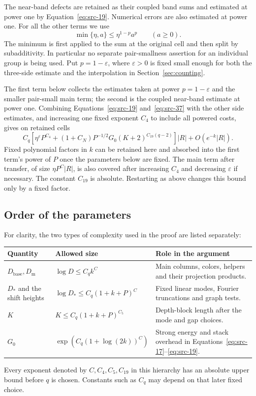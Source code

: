 The near-band defects are retained as their coupled band sums and
estimated at power one by Equation~\eqref{eq:src-19}.  Numerical errors
are also estimated at power one.  For all the other terms we use
\[
 \min\{\eta,a\}\le\eta^{1-p}a^p\qquad(a\ge0).
\]
The minimum is first applied to the sum at the original cell and then
split by subadditivity.  In particular no separate pair-smallness
assertion for an individual group is being used.  Put $p=1-\varepsilon$,
where $\varepsilon>0$ is fixed small enough for both the three-side
estimate and the interpolation in Section~\ref{sec:counting}.

The first term below collects the estimates taken at power
$p=1-\varepsilon$ and the smaller pair-small main term; the second is the
coupled near-band estimate at power one.  Combining
Equations~\eqref{eq:src-19} and~\eqref{eq:src-37} with the other side
estimates, and increasing one fixed exponent $C_4$ to include all powered
costs, gives on retained cells
\[
 C_q\left[
 \eta^{\varepsilon}P^{C_4}
 +(1+C_N)P^{-1/2}G_0(K+2)^{C_{19}(q-2)}
 \right]|R|+O(e^{-k}|R|).
\]
Fixed polynomial factors in $k$ can be retained here and absorbed into
the first term's power of $P$ once the parameters below are fixed.  The
main term after transfer, of size $\eta P^C|R|$, is also covered after
increasing $C_4$ and decreasing $\varepsilon$ if necessary.  The constant
$C_{19}$ is absolute.  Restarting as above changes this bound only by a
fixed factor.

\subsection{Order of the parameters}
For clarity, the two types of complexity used in the proof are listed
separately:
\begin{center}
\begin{tabular}{p{.28\linewidth}p{.31\linewidth}p{.30\linewidth}}
\toprule
Quantity & Allowed size & Role in the argument\\
\midrule
$D_{\mathrm{base}},D_{\mathrm m}$
 & $\log D\le C_q k^C$
 & Main columns, colors, helpers and their projection products.\\[3pt]
$D_*$ and the shift heights
 & $\log D_*\le C_q(1+k+P)^C$
 & Fixed linear modes, Fourier truncations and graph tests.\\[3pt]
$K$
 & $K\le C_q(1+k+P)^{C_5}$
 & Depth-block length after the mode and gap choices.\\[3pt]
$G_0$
 & $\exp(C_q(1+\log(2k))^C)$
 & Strong energy and stack overhead in Equations~\eqref{eq:src-17}--\eqref{eq:src-19}.\\
\bottomrule
\end{tabular}
\end{center}
Every exponent denoted by $C,C_4,C_5,C_{19}$ in this hierarchy has an
absolute upper bound before $q$ is chosen.  Constants such as $C_q$ may
depend on that later fixed choice.

